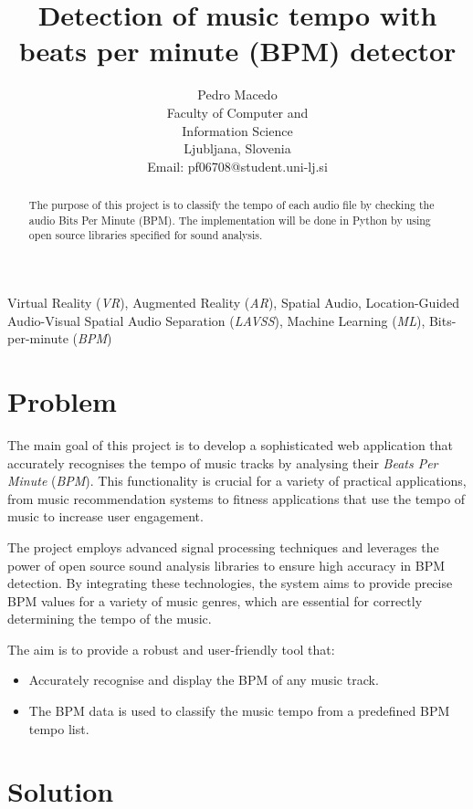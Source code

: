 \documentclass{IEEEtran}
\title{Detection of music tempo with beats per minute
(BPM) detector}
\author{Pedro Macedo \\
Faculty of Computer and \\
Information Science \\ 
Ljubljana, Slovenia \\
Email: pf06708@student.uni-lj.si
}
\begin{document}
\maketitle

\begin{abstract}
    The purpose of this project is to classify the tempo of each audio file by checking the audio Bits Per Minute (BPM). The implementation will be done in Python by using open source libraries specified for sound analysis.
\end{abstract}

\begin{IEEEkeywords}
    Virtual Reality (\textit{VR}), Augmented Reality (\textit{AR}), Spatial Audio, Location-Guided Audio-Visual Spatial Audio Separation (\textit{LAVSS}), Machine Learning (\textit{ML}), Bits-per-minute (\textit{BPM})
\end{IEEEkeywords}

\section{Problem}

The main goal of this project is to develop a sophisticated web application that accurately recognises the tempo of music tracks by analysing their \textit{Beats Per Minute} (\textit{BPM}). This functionality is crucial for a variety of practical applications, from music recommendation systems to fitness applications that use the tempo of music to increase user engagement.

The project employs advanced signal processing techniques and leverages the power of open source sound analysis libraries to ensure high accuracy in BPM detection. By integrating these technologies, the system aims to provide precise BPM values for a variety of music genres, which are essential for correctly determining the tempo of the music.

The aim is to provide a robust and user-friendly tool that:
\begin{itemize}
    \item Accurately recognise and display the BPM of any music track.
    \item The BPM data is used to classify the music tempo from a predefined BPM tempo list.
\end{itemize}

\section{Solution}
\end{document}
